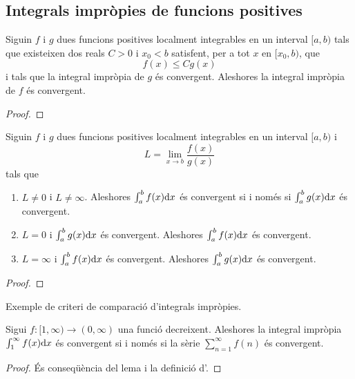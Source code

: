 \documentclass[../Apunts.tex]{subfiles}
\begin{document}
	\subsection{Integrals impròpies de funcions positives}
	\begin{lemma}
		\label{lema:criteri de comparació d'integrals impròpies}
		Siguin \(f\) i \(g\) dues funcions positives localment integrables en un interval \([a,b)\) tals que existeixen dos reals \(C>0\) i \(x_{0}<b\) satisfent, per a tot \(x\) en \([x_{0},b)\), que
		\[f(x)\leq Cg(x)\]
		i tals que la integral impròpia de \(g\) és convergent. Aleshores la integral impròpia de \(f\) és convergent.
		\begin{proof}
		\end{proof}
	\end{lemma}
	\begin{theorem}
		\label{def:criteri de comapració d'integrals impròpies}
		Siguin \(f\) i \(g\) dues funcions positives localment integrables en un interval \([a,b)\) i
		\[L=\lim_{x\to b}\frac{f(x)}{g(x)}\]
		tals que
		\begin{enumerate}
			\item\label{def:criteri de comapració d'integrals impròpies:eq1} \(L\neq0\) i \(L\neq\infty\). Aleshores \(\int_{a}^{b}f(x)\mathrm{d} x\) és convergent si i només si \(\int_{a}^{b}g(x)\mathrm{d} x\) és convergent.
			\item\label{def:criteri de comapració d'integrals impròpies:eq2} \(L=0\) i \(\int_{a}^{b}g(x)\mathrm{d} x\) és convergent. Aleshores \(\int_{a}^{b}f(x)\mathrm{d} x\) és convergent.
			\item\label{def:criteri de comapració d'integrals impròpies:eq3} \(L=\infty\) i \(\int_{a}^{b}f(x)\mathrm{d} x\) és convergent. Aleshores \(\int_{a}^{b}g(x)\mathrm{d} x\) és convergent.
		\end{enumerate}
		\begin{proof}
		\end{proof}
	\end{theorem}
	\begin{example}
		\label{ex:criteri de comapració d'integrals impròpies}
		Exemple de criteri de comparació d'integrals impròpies. %
		\begin{solution}
		\end{solution}
	\end{example}
	\begin{theorem}
		\label{thm:criteri de la integral per integrals impròpies}
		Sigui \(f\colon[1,\infty)\longrightarrow(0,\infty)\) una funció decreixent. Aleshores la integral impròpia \(\int_{1}^{\infty}f(x)\mathrm{d} x\) és convergent si i només si la sèrie \(\sum_{n=1}^{\infty}f(n)\) és convergent.
		\begin{proof}
			És conseqüència del lema  i la definició d'.
		\end{proof}
	\end{theorem}
\end{document}
